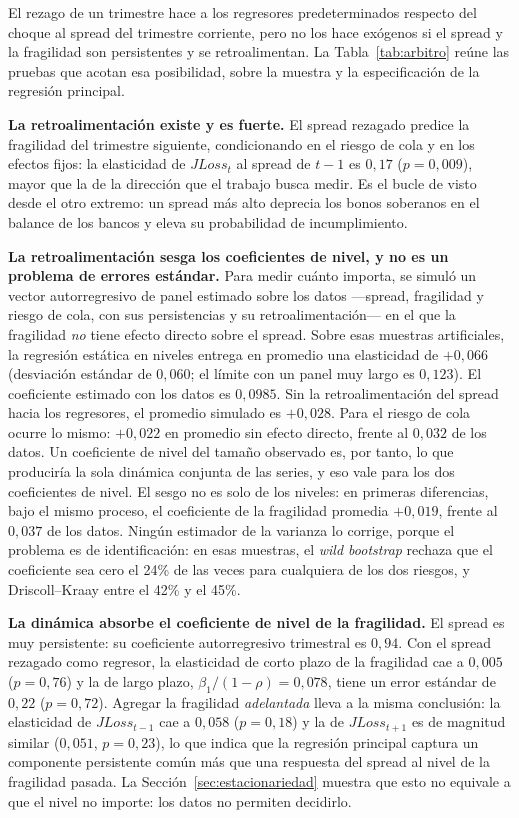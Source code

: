 El rezago de un trimestre hace a los regresores predeterminados respecto del choque al spread del trimestre corriente, pero no los hace exógenos si el spread y la fragilidad son persistentes y se retroalimentan. La Tabla~\ref{tab:arbitro} reúne las pruebas que acotan esa posibilidad, sobre la muestra y la especificación de la regresión principal.



\textbf{La retroalimentación existe y es fuerte.} El spread rezagado predice la fragilidad del trimestre siguiente, condicionando en el riesgo de cola y en los efectos fijos: la elasticidad de $JLoss_t$ al spread de $t-1$ es $0{,}17$ ($p=0{,}009$), mayor que la de la dirección que el trabajo busca medir. Es el bucle de \citet{FarhiTirole2018b} visto desde el otro extremo: un spread más alto deprecia los bonos soberanos en el balance de los bancos y eleva su probabilidad de incumplimiento.

\textbf{La retroalimentación sesga los coeficientes de nivel, y no es un problema de errores estándar.} Para medir cuánto importa, se simuló un vector autorregresivo de panel estimado sobre los datos ---spread, fragilidad y riesgo de cola, con sus persistencias y su retroalimentación--- en el que la fragilidad \emph{no} tiene efecto directo sobre el spread. Sobre esas muestras artificiales, la regresión estática en niveles entrega en promedio una elasticidad de $+0{,}066$ (desviación estándar de $0{,}060$; el límite con un panel muy largo es $0{,}123$). El coeficiente estimado con los datos es $0{,}0985$. Sin la retroalimentación del spread hacia los regresores, el promedio simulado es $+0{,}028$. Para el riesgo de cola ocurre lo mismo: $+0{,}022$ en promedio sin efecto directo, frente al $0{,}032$ de los datos. Un coeficiente de nivel del tamaño observado es, por tanto, lo que produciría la sola dinámica conjunta de las series, y eso vale para los dos coeficientes de nivel. El sesgo no es solo de los niveles: en primeras diferencias, bajo el mismo proceso, el coeficiente de la fragilidad promedia $+0{,}019$, frente al $0{,}037$ de los datos. Ningún estimador de la varianza lo corrige, porque el problema es de identificación: en esas muestras, el \textit{wild bootstrap} rechaza que el coeficiente sea cero el 24\% de las veces para cualquiera de los dos riesgos, y Driscoll--Kraay entre el 42\% y el 45\%.

\textbf{La dinámica absorbe el coeficiente de nivel de la fragilidad.} El spread es muy persistente: su coeficiente autorregresivo trimestral es $0{,}94$. Con el spread rezagado como regresor, la elasticidad de corto plazo de la fragilidad cae a $0{,}005$ ($p=0{,}76$) y la de largo plazo, $\beta_1/(1-\rho)=0{,}078$, tiene un error estándar de $0{,}22$ ($p=0{,}72$). Agregar la fragilidad \emph{adelantada} lleva a la misma conclusión: la elasticidad de $JLoss_{t-1}$ cae a $0{,}058$ ($p=0{,}18$) y la de $JLoss_{t+1}$ es de magnitud similar ($0{,}051$, $p=0{,}23$), lo que indica que la regresión principal captura un componente persistente común más que una respuesta del spread al nivel de la fragilidad pasada. La Sección~\ref{sec:estacionariedad} muestra que esto no equivale a que el nivel no importe: los datos no permiten decidirlo.

